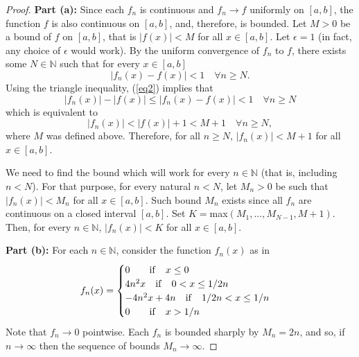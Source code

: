 \documentclass[11pt]{article}
\theoremstyle{plain}
\theoremstyle{remark}
\newcommand {\mbN} {\mathbb N}
\begin{document}
\begin{proof}
	{\bf Part (a):} 
	Since each $f_n$ is continuous and $f_n \to f$ uniformly on $[a,b]$, the function $f$ is also continuous on $[a,b]$, and, therefore, is bounded. 
	Let $M>0$ be a bound of $f$ on $[a,b]$, that is $|f(x)|<M$ for all $x \in [a,b]$.
	Let $\epsilon = 1$ (in fact, any choice of $\epsilon$ would work). 
	By the uniform convergence of $f_n$ to $f$, there exists some $N \in \mbN$ such that for every $x \in [a,b]$ 
	\begin{equation}
	\label{eq2}
	|f_n(x)-f(x)|<1 \quad \forall n \geq N.
	\end{equation}
	Using the triangle inequality, (\ref{eq2}) implies that 
	$$
	|f_n(x)| - |f(x)| \leq |f_n(x)-f(x)|<1 \quad \forall n \geq N
	$$
	which is equivalent to 
	$$
	|f_n(x)|<|f(x)|+1 <M+1 \quad \forall n \geq N,
	$$
	where $M$ was defined above. Therefore, for all $n \geq N$, 
	$|f_n(x)|<M+1$ for all $x \in [a,b]$. 
	
	We need to find the bound which will work for every $n \in \mbN$ (that is, including $n<N$). For that purpose, for every natural $n<N$, let $M_n>0$ be such that $|f_n(x)|<M_n$ for all 
	$x \in [a,b]$. Such bound $M_n$ exists since all $f_n$ are continuous on a closed interval $[a,b]$. Set 
	$K=$max$(M_1,...,M_{N-1}, M+1)$. Then, for every $n\in \mbN$, 
	$|f_n(x)| < K$ for all $x \in [a,b]$.
	
	{\bf Part (b):} 
	For each $n \in \mbN$, consider the function $f_n(x)$ as in
	$$
	f_n(x) = \begin{cases}
	0 \quad \quad {\rm if} \quad  x \leq 0 \\
	4n^2x \quad {\rm if} \quad 0<x\leq 1/2n \\
	-4n^2x+4n \quad {\rm if} \quad 1/2n<x \leq 1/n \\
	0 \quad \quad {\rm if} \quad x>1/n
	\end{cases}
	$$
	Note that $f_n \to 0$ pointwise. Each $f_n$ is bounded sharply by $M_n = 2n$, and so, if $n \to \infty$ then the sequence of bounds $M_n \to \infty$.
\end{proof}

	
\end{document}
